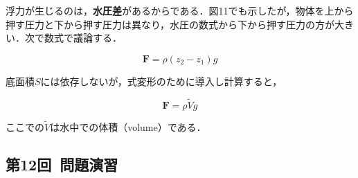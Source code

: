\documentclass[a4paper,11pt]{ltjsarticle}
\begin{document}
浮力が生じるのは，\textbf{水圧差}があるからである．図11でも示したが，物体を上から押す圧力と下から押す圧力は異なり，水圧の数式から下から押す圧力の方が大きい．次で数式で議論する．

\begin{equation}
  \bm{F} = \rho (z_2 - z_1)g
\end{equation}

底面積$S$には依存しないが，式変形のために導入し計算すると，

\begin{equation}
  \bm{F} = \rho \tilde{V}g
\end{equation}

ここでの$\tilde{V}$は水中での体積（volume）である．

\clearpage

\subsection{第12回\ 問題演習}
\end{document}
